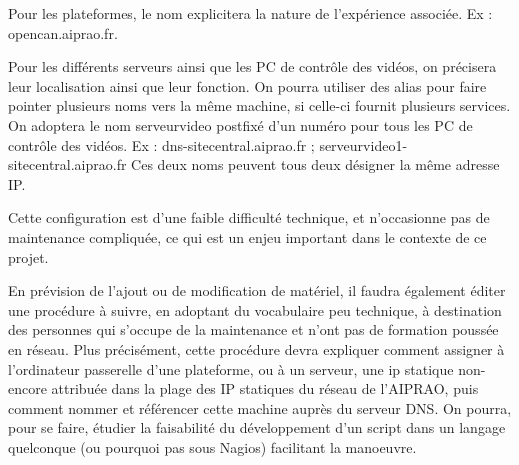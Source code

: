 	Pour les plateformes, le nom explicitera la nature de l'expérience associée.
	Ex : opencan.aiprao.fr.

	Pour les différents serveurs ainsi que les PC de contrôle des vidéos, on précisera leur localisation ainsi que leur fonction. On pourra utiliser des alias pour faire pointer plusieurs noms vers la même machine, si celle-ci fournit plusieurs services. On adoptera le nom serveurvideo postfixé d'un numéro pour tous les PC de contrôle des vidéos.
	Ex : dns-sitecentral.aiprao.fr ; serveurvideo1-sitecentral.aiprao.fr 
	Ces deux noms peuvent tous deux désigner la même adresse IP.

	Cette configuration est d'une faible difficulté technique, et n'occasionne pas de maintenance compliquée, ce qui est un enjeu important dans le contexte de ce projet.

	En prévision de l'ajout ou de modification de matériel, il faudra également éditer une procédure à suivre, en adoptant du vocabulaire peu technique, à destination des personnes qui s'occupe de la maintenance et n'ont pas de formation poussée en réseau. 
	Plus précisément, cette procédure devra expliquer comment assigner à l'ordinateur passerelle d'une plateforme, ou à un serveur, une ip statique non-encore attribuée dans la plage des IP statiques du réseau de l'AIPRAO, puis comment nommer et référencer cette machine auprès du serveur DNS.
On pourra, pour se faire, étudier la faisabilité du développement d'un script dans un langage quelconque (ou pourquoi pas sous Nagios) facilitant la manoeuvre.
